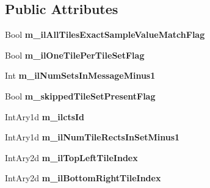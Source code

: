 \subsection*{Public Attributes}
\begin{DoxyCompactItemize}
\item 
\mbox{\label{class_s_e_i_inter_layer_constrained_tile_sets_a690428585810c2f9fcc010a2c99b17b8}} 
Bool {\bfseries m\+\_\+il\+All\+Tiles\+Exact\+Sample\+Value\+Match\+Flag}
\item 
\mbox{\label{class_s_e_i_inter_layer_constrained_tile_sets_acc74ea4782e2364f397fd32cb87952ec}} 
Bool {\bfseries m\+\_\+il\+One\+Tile\+Per\+Tile\+Set\+Flag}
\item 
\mbox{\label{class_s_e_i_inter_layer_constrained_tile_sets_a677c896de8d5a79838a03b9d1d50ab27}} 
Int {\bfseries m\+\_\+il\+Num\+Sets\+In\+Message\+Minus1}
\item 
\mbox{\label{class_s_e_i_inter_layer_constrained_tile_sets_abee6b242561a6b0b2915c923fd05001b}} 
Bool {\bfseries m\+\_\+skipped\+Tile\+Set\+Present\+Flag}
\item 
\mbox{\label{class_s_e_i_inter_layer_constrained_tile_sets_acf4f59df66135a43718d264a6a25ff4d}} 
Int\+Ary1d {\bfseries m\+\_\+ilcts\+Id}
\item 
\mbox{\label{class_s_e_i_inter_layer_constrained_tile_sets_a55f050fca94a1cdf2bf88eb1666135bb}} 
Int\+Ary1d {\bfseries m\+\_\+il\+Num\+Tile\+Rects\+In\+Set\+Minus1}
\item 
\mbox{\label{class_s_e_i_inter_layer_constrained_tile_sets_a5bb143472e981c4851eae21ece90a2dd}} 
Int\+Ary2d {\bfseries m\+\_\+il\+Top\+Left\+Tile\+Index}
\item 
\mbox{\label{class_s_e_i_inter_layer_constrained_tile_sets_a68f46d06444a2fa4483a93738af0f664}} 
Int\+Ary2d {\bfseries m\+\_\+il\+Bottom\+Right\+Tile\+Index}

\end{DoxyCompactItemize}
